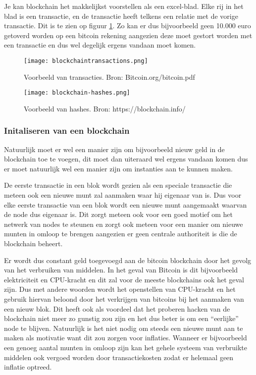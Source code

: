  Je kan blockchain het makkelijkst voorstellen als een excel-blad. Elke rij in het blad is een transactie, en de transactie heeft telkens een relatie met de vorige transactie. Dit is te zien op figuur \ref{fig:blockchain-transaction-example}. Zo kan er dus bijvoorbeeld geen 10.000 euro getoverd worden op een bitcoin rekening aangezien deze moet gestort worden met een transactie en dus wel degelijk ergens vandaan moet komen.
 
 \begin{figure}
 	\texttt{[image: blockchaintransactions.png]}
 	\caption{Voorbeeld van transacties. Bron: Bitcoin.org/bitcoin.pdf}
 	\label{fig:blockchain-transaction-example}
 \end{figure}
\begin{figure}
	\texttt{[image: blockchain-hashes.png]}
	\caption{Voorbeeld van hashes. Bron: https://blockchain.info/}
	\label{fig:blockchain-hash-example}
\end{figure}
 
 \subsubsection{Initaliseren van een blockchain}
 Natuurlijk moet er wel een manier zijn om bijvoorbeeld nieuw geld in de blockchain toe te voegen, dit moet dan uiteraard wel ergens vandaan komen dus er moet natuurlijk wel een manier zijn om instanties aan te kunnen maken. 
 
 De eerste transactie in een blok wordt gezien als een speciale transactie die meteen ook een nieuwe munt zal aanmaken waar hij eigenaar van is. Dus voor elke eerste transactie van een blok wordt een nieuwe munt aangemaakt waarvan de node dus eigenaar is. Dit zorgt meteen ook voor een goed motief om het netwerk van nodes te steunen en zorgt ook meteen voor een manier om nieuwe munten in omloop te brengen aangezien er geen centrale authoriteit is die de blockchain beheert. 
 
 Er wordt dus constant geld toegevoegd aan de bitcoin blockchain door het gevolg van het verbruiken van middelen. In het geval van Bitcoin is dit bijvoorbeeld elektriciteit en CPU-kracht en dit zal voor de meeste blockchains ook het geval zijn. Dus met andere woorden wordt het openstellen van CPU-kracht en het gebruik hiervan beloond door het verkrijgen van bitcoins bij het aanmaken van een nieuw blok. Dit heeft ook als voordeel dat het proberen hacken van de blockchain niet meer zo gunstig zou zijn en het dus beter is om een ``eerlijke'' node te blijven. Natuurlijk is het niet nodig om steeds een nieuwe munt aan te maken als motivatie want dit zou zorgen voor inflaties. Wanneer er bijvoorbeeld een genoeg aantal munten in omloop zijn kan het gehele systeem van verbruikte middelen ook vergoed worden door transactiekosten zodat er helemaal geen inflatie optreed.
 

